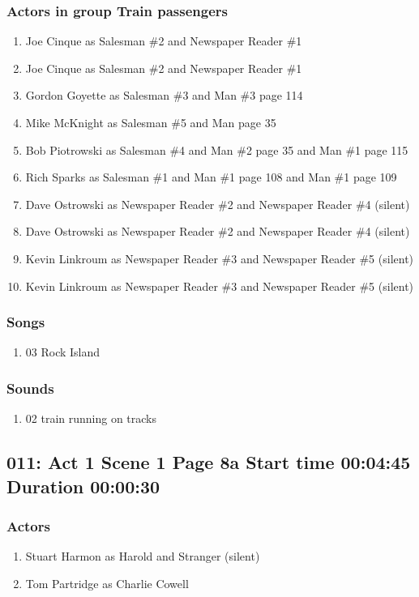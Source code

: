 \subsubsection{Actors in group Train passengers}
\begin{enumerate}
\item Joe Cinque as Salesman \#2 and Newspaper Reader \#1
\item Joe Cinque as Salesman \#2 and Newspaper Reader \#1
\item Gordon Goyette as Salesman \#3 and Man \#3 page 114
\item Mike McKnight as Salesman \#5 and Man page 35
\item Bob Piotrowski as Salesman \#4 and Man \#2 page 35 and Man \#1 page 115
\item Rich Sparks as Salesman \#1 and Man \#1 page 108 and Man \#1 page 109
\item Dave Ostrowski as Newspaper Reader \#2 and Newspaper Reader \#4 (silent)
\item Dave Ostrowski as Newspaper Reader \#2 and Newspaper Reader \#4 (silent)
\item Kevin Linkroum as Newspaper Reader \#3 and Newspaper Reader \#5 (silent)
\item Kevin Linkroum as Newspaper Reader \#3 and Newspaper Reader \#5 (silent)
\end{enumerate}

\subsubsection{Songs}
\begin{enumerate}
\item 03 Rock Island
\end{enumerate}\subsubsection{Sounds}
\begin{enumerate}
\item 02 train running on tracks
\end{enumerate}
\subsection{011: Act 1 Scene 1 Page 8a Start time 00:04:45 Duration 00:00:30}

\subsubsection{Actors}
\begin{enumerate}
\item Stuart Harmon as Harold and Stranger (silent)
\item Tom Partridge as Charlie Cowell
\end{enumerate}
